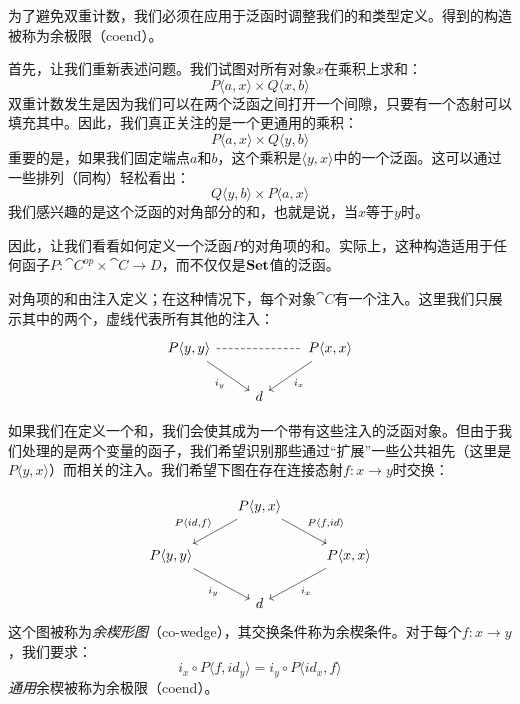 \documentclass[DaoFP]{subfiles}
\begin{document}
 为了避免双重计数，我们必须在应用于泛函时调整我们的和类型定义。得到的构造被称为余极限（coend）。

 首先，让我们重新表述问题。我们试图对所有对象$x$在乘积上求和：
 \[ P \langle a, x \rangle \times Q \langle x, b \rangle \]
 双重计数发生是因为我们可以在两个泛函之间打开一个间隙，只要有一个态射可以填充其中。因此，我们真正关注的是一个更通用的乘积：
 \[ P \langle a, x \rangle \times Q \langle y, b \rangle \]
 重要的是，如果我们固定端点$a$和$b$，这个乘积是$\langle y, x \rangle$中的一个泛函。这可以通过一些排列（同构）轻松看出：
 \[ Q \langle y, b \rangle \times P \langle a, x \rangle \]
 我们感兴趣的是这个泛函的对角部分的和，也就是说，当$x$等于$y$时。

 因此，让我们看看如何定义一个泛函$P$的对角项的和。实际上，这种构造适用于任何函子$P \colon \cat C^{op} \times \cat C \to D$，而不仅仅是$\mathbf{Set}$值的泛函。

 对角项的和由注入定义；在这种情况下，每个对象$\cat C$有一个注入。这里我们只展示其中的两个，虚线代表所有其他的注入：
 \[
  \begin{tikzcd}
   P \langle y, y \rangle
   \arrow[dr, "i_y"']
   \arrow[rr, dash, dashed]
   &&P \langle x, x \rangle
   \arrow[dl, "i_x"]
   \\
   & d
  \end{tikzcd}
 \]

 如果我们在定义一个和，我们会使其成为一个带有这些注入的泛函对象。但由于我们处理的是两个变量的函子，我们希望识别那些通过“扩展”一些公共祖先（这里是$P \langle y, x \rangle$）而相关的注入。我们希望下图在存在连接态射$f \colon x \to y$时交换：

 \[
  \begin{tikzcd}
   &P \langle y, x \rangle
   \arrow[ld, "{P \langle id, f \rangle}"']
   \arrow[rd, "{P \langle f, id \rangle}"]
   \\
   P \langle y, y \rangle
   \arrow[dr, "i_y"']
   &&P \langle x, x \rangle
   \arrow[dl, "i_x"]
   \\
   &d
  \end{tikzcd}
 \]
 这个图被称为\emph{余楔形图}（co-wedge），其交换条件称为余楔条件。对于每个$f \colon x \to y$，我们要求：
 \[ i_x \circ P \langle f, id_y \rangle = i_y \circ P \langle id_x, f \rangle \]
 \emph{通用}余楔被称为余极限（coend）。
\end{document}
